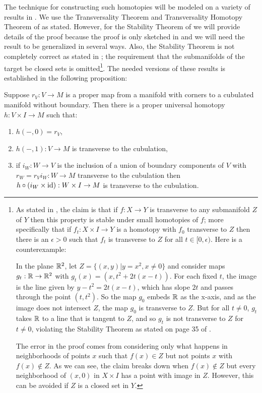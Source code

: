  The technique for constructing such homotopies will be modeled on a variety of results in \cite{GuPo74}. We use the Transversality Theorem and Transversality Homotopy Theorem of \cite[Section 2.3]{GuPo74} as stated. However, for the Stability Theorem of \cite[Section 1.6]{GuPo74} we will provide details of the proof because the proof is only sketched in \cite{GuPo74} and we will need the result to be generalized in several ways. Also, the Stability Theorem is not completely correct as stated in \cite[Section 1.6]{GuPo74}; the requirement that the submanifolds of the target be closed sets is omitted\footnote{As stated in \cite{GuPo74}, the claim is that if $f:X\to Y$ is transverse to any submanifold $Z$ of $Y$ then this property is stable under small homotopies of $f$; more specifically that if $f_t:X\times I\to Y$ is a homotopy with $f_0$ transverse to $Z$ then there is an $\epsilon>0$ such that $f_t$ is transverse to $Z$ for all $t\in[0,\epsilon)$. Here is a counterexample:

In the plane $\mathbb{R}^2$, let $Z=\{(x,y)|y=x^2, x\neq 0\}$ and consider maps  $g_t: \mathbb{R} \to \mathbb{R}^2$ with
$g_t(x)=(x,t^2+2t(x-t))$. For each fixed $t$, the image is the line given by $y-t^2=2t(x-t)$, which has slope $2t$ and passes through the point $(t,t^2)$. So the map $g_0$ embeds $\mathbb{R}$ as the x-axis, and as the image does not intersect $Z$, the map $g_0$ is transverse to $Z$. But for all $t\neq 0$, $g_t$ takes $\mathbb{R}$ to a line that is tangent to $Z$, and so $g_t$ is not transverse to $Z$ for $t\neq 0$, violating the Stability Theorem as stated on page 35 of \cite{GuPo74}.

The error in the proof comes from considering only what happens in neighborhoods of points $x$ such that $f(x)\in Z$ but not points $x$ with $f(x)\notin Z$. As we can see, the claim breaks down when $f(x)\notin Z$ but every neighborhood of $(x,0)$ in $X\times I$ has a point with image in $Z$. However, this can be avoided if $Z$ is a closed set in $Y$.}. The needed versions of these results is established in the following proposition:




\begin{proposition}\label{P: ball stability}
Suppose  $r_V:V\to M$ is a proper map from a manifold with corners to a cubulated manifold without boundary.  Then there is a proper universal homotopy $h:V\times I\to M$ such that:
\begin{enumerate}
\item $h(-,0)=r_V$,

\item $h(-,1):V\to M$ is transverse to the cubulation,

\item  if $i_W:W\to V$ is the inclusion of a union of boundary components of $V$ with $r_W=r_Vi_W:W\to M$ transverse to the cubulation then $h\circ(i_{W}\times \mathrm{id}):W\times I\to M$ is transverse to the cubulation.

\end{enumerate}
\end{proposition}



